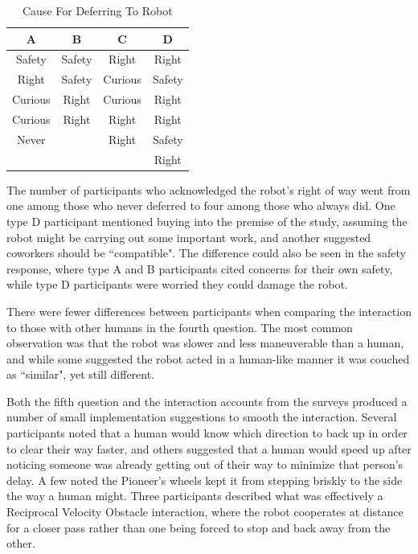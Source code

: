 \documentclass[letterpaper, 10 pt, conference]{ieeeconf}  %
\begin{document}
\begin{table}[h]
\caption{Cause For Deferring To Robot}
\label{Defer}
\begin{center}
\begin{tabular}{|c||c||c||c|}
\hline
\textbf{A} & \textbf{B} & \textbf{C} & \textbf{D}\\
\hline
Safety & Safety & Right & Right\\
\hline
Right & Safety & Curious & Safety\\
\hline
Curious & Right & Curious & Right\\
\hline
Curious & Right & Right & Right\\
\hline
Never & & Right & Safety\\
\hline
 & & & Right\\
\hline
\end{tabular}
\end{center}
\end{table}

The number of participants who acknowledged the robot's right of way went from one among those who never deferred to four among those who always did. One type D participant mentioned buying into the premise of the study, assuming the robot might be carrying out some important work, and another suggested coworkers should be ``compatible". The difference could also be seen in the safety response, where type A and B participants cited concerns for their own safety, while type D participants were worried they could damage the robot. 

There were fewer differences between participants when comparing the interaction to those with other humans in the fourth question. The most common observation was that the robot was slower and less maneuverable than a human, and while some suggested the robot acted in a human-like manner it was couched as ``similar", yet still different.

Both the fifth question and the interaction accounts from the surveys produced a number of small implementation suggestions to smooth the interaction. Several participants noted that a human would know which direction to back up in order to clear their way faster, and others suggested that a human would speed up after noticing someone was already getting out of their way to minimize that person's delay. A few noted the Pioneer's wheels kept it from stepping briskly to the side the way a human might. Three participants described what was effectively a Reciprocal Velocity Obstacle interaction, where the robot cooperates at distance for a closer pass rather than one being forced to stop and back away from the other. 
\end{document}
